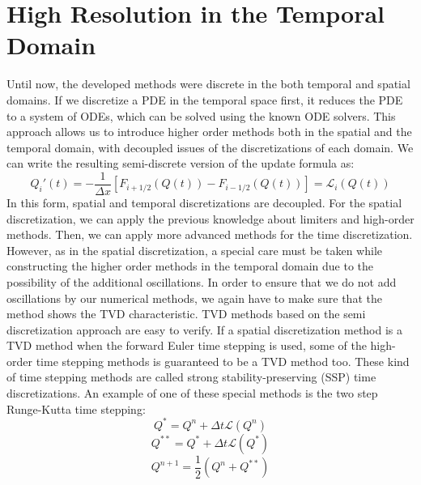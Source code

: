 \documentclass[journal,onecolumn]{IEEEtran}
\begin{document}
\section{High Resolution in the Temporal Domain}
Until now, the developed methods were discrete in the both temporal and spatial domains. If we discretize a PDE in the temporal space first, it reduces the PDE to a system of ODEs, which can be solved using the known ODE solvers. This approach allows us to introduce higher order methods both in the spatial and the temporal domain, with decoupled issues of the discretizations of each domain. We can write the resulting semi-discrete version of the update formula as:
$$
    Q_i'(t) = -\frac{1}{\Delta x}[F_{i+1/2}(Q(t)) - F_{i-1/2}(Q(t))] = \mathcal{L}_i(Q(t))
$$
In this form, spatial and temporal discretizations are decoupled. For the spatial discretization, we can apply the previous knowledge about limiters and high-order methods. Then, we can apply more advanced methods for the time discretization. However, as in the spatial discretization, a special care must be taken while constructing the higher order methods in the temporal domain due to the possibility of the additional oscillations. In order to ensure that we do not add oscillations by our numerical methods, we again have to make sure that the method shows the TVD characteristic. TVD methods based on the semi discretization approach are easy to verify. If a spatial discretization method is a TVD method when the forward Euler time stepping is used, some of the high-order time stepping methods is guaranteed to be a TVD method too. These kind of time stepping methods are called strong stability-preserving (SSP) time discretizations. An example of one of these special methods is the two step Runge-Kutta time stepping:
$$
Q^*  = Q^n + \Delta t \mathcal{L}(Q^n)
$$
$$
Q^{**}  = Q^* + \Delta t \mathcal{L}(Q^*)
$$
$$
Q^{n+1}  = \frac{1}{2}(Q^n + Q^{**})
$$
\end{document}
